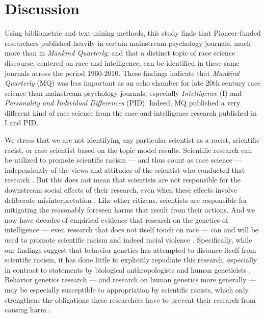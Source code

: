 \documentclass[12pt]{article}
\begin{document}
\hypertarget{discussion}{%
\section*{Discussion}\label{discussion}}

Using bibliometric and text-mining methods, this study finds that Pioneer-funded researchers published heavily in certain mainstream psychology journals, much more than in \emph{Mankind Quarterly}; and that a distinct topic of race science discourse, centered on race and intelligence, can be identified in these same journals across the period 1960-2010. These findings indicate that \emph{Mankind Quarterly} (MQ) was less important as an echo chamber for late 20th century race science than mainstream psychology journals, especially \emph{Intelligence} (I) and \emph{Personality and Individual Differences} (PID). Indeed, MQ published a very different kind of race science from the race-and-intelligence research published in I and PID.

We stress that we are not identifying any particular scientist as a racist, scientific racist, or race scientist based on the topic model results. Scientific research can be utilized to promote scientific racism --- and thus count as race science --- independently of the views and attitudes of the scientist who conducted that research \cite{TaberyWhyStudyingGenetics2015, GillbornSoftlySoftlyGenetics2016, CarlsonQuantifyingContextualizingImpact2020, HennWhyDNANo2021}. But this does not mean that scientists are not responsible for the downstream social effects of their
research, even when these effects involve deliberate misinterpretation \cite{DouglasSciencePolicyValuefree2009, KitcherArgumentFreeInquiry1997, KouranyShouldKnowledgeBe2016, KouranyShouldKnowledgeBe2016, BlockIQHeritabilityInequality1974a}. Like other citizens, scientists are responsible for mitigating the reasonably foreseen harms that result from their actions. And we now have decades of empirical evidence that research on the genetics of intelligence --- even research that does not itself touch on race --- can and will be used to promote scientific racism and indeed racial violence \cite{MeyerWrestlingSocialBehavioral2023}. Specifically, while our findings suggest that behavior genetics has attempted to distance itself from scientific racism, it has done little to explicitly repudiate this research, especially in contrast to statements by biological anthropologists \cite{FuentesAAPAStatementRace2019} and human geneticists \cite{JacksonFacingOurHistory2023}. Behavior genetics research --- and research on human genetics more generally --- may be especially susceptible to appropriation by scientific racists, which only strengthens the obligations these researchers have to prevent their research from causing harm \cite{CarlsonQuantifyingContextualizingImpact2020, OgbunugaforDNABasketballBirthday2022}.
\end{document}
